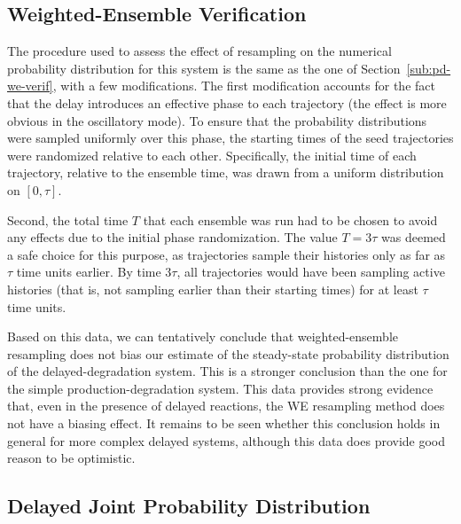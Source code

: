 \documentclass[english,letterpaper,12pt]{article}
\begin{document}
\begin{doublespacing}
\subsection{Weighted-Ensemble Verification} %
\label{sub:dd-we-verif}

The procedure used to assess the effect of resampling on the numerical probability distribution for this system is the same as the one of Section~\ref{sub:pd-we-verif}, with a few modifications. The first modification accounts for the fact that the delay introduces an effective phase to each trajectory (the effect is more obvious in the oscillatory mode). To ensure that the probability distributions were sampled uniformly over this phase, the starting times of the seed trajectories were randomized relative to each other. Specifically, the initial time of each trajectory, relative to the ensemble time, was drawn from a uniform distribution on $[0, \tau]$.

Second, the total time $T$ that each ensemble was run had to be chosen to avoid any effects due to the initial phase randomization. The value $T = 3\tau$ was deemed a safe choice for this purpose, as trajectories sample their histories only as far as $\tau$ time units earlier. By time $3\tau$, all trajectories would have been sampling active histories (that is, not sampling earlier than their starting times) for at least $\tau$ time units.



Based on this data, we can tentatively conclude that weighted-ensemble resampling does not bias our estimate of the steady-state probability distribution of the delayed-degradation system. This is a stronger conclusion than the one for the simple production-degradation system. This data provides strong evidence that, even in the presence of delayed reactions, the WE resampling method does not have a biasing effect. It remains to be seen whether this conclusion holds in general for more complex delayed systems, although this data does provide good reason to be optimistic.


\subsection{Delayed Joint Probability Distribution} %
\label{sub:delayed-joint-dist}


\end{doublespacing}
\end{document}

